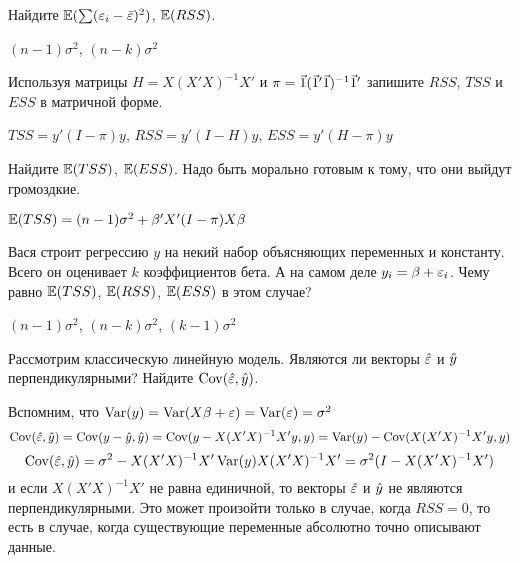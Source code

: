 \begin{problem}
Найдите $\mathbb{E}(\sum (\varepsilon_i-\bar{\varepsilon})^2 )$, $\mathbb{E}(RSS)$.


\begin{sol}
$(n-1)\sigma^2$, $(n-k)\sigma^2$
\end{sol}
\end{problem}



\begin{problem}
Используя матрицы $H=X(X'X)^{-1}X'$ и $\pi=\v1(\v1'\v1)^{-1}\v1'$ запишите $RSS$, $TSS$ и $ESS$ в матричной форме.

\begin{sol}
$TSS=y'(I-\pi)y$, $RSS=y'(I-H)y$, $ESS=y'(H-\pi)y$
\end{sol}
\end{problem}




\begin{problem}
Найдите $\mathbb{E}(TSS)$, $\mathbb{E}(ESS)$. Надо быть морально готовым к тому, что они выйдут громоздкие.

\begin{sol}
$\mathbb{E}(TSS)=(n-1)\sigma^2+\beta'X'(I-\pi)X\beta$
\end{sol}
\end{problem}



\begin{problem}
Вася строит регрессию $y$ на некий набор объясняющих переменных и константу.
Всего он оценивает $k$ коэффициентов бета.
А на самом деле $y_i=\beta + \varepsilon_i$. Чему равно $\mathbb{E}(TSS)$, $\mathbb{E}(RSS)$, $\mathbb{E}(ESS)$ в этом случае?


\begin{sol}
$(n-1)\sigma^2$, $(n-k)\sigma^2$, $(k-1)\sigma^2$
\end{sol}
\end{problem}




\begin{problem}
Рассмотрим классическую линейную модель. Являются ли векторы $\hat{\varepsilon}$ и $\hat{y}$ перпендикулярными? Найдите $\operatorname{Cov}(\hat{\varepsilon},\hat{y})$.


\begin{sol}
Вспомним, что $\operatorname{Var}(y)=\operatorname{Var}(X\beta+\varepsilon)=\operatorname{Var}(\varepsilon)=\sigma^2$
\[
\operatorname{Cov}(\hat{\varepsilon},\hat{y})=\operatorname{Cov}(y-\hat{y},\hat{y})=\operatorname{Cov}(y-X(X'X)^{-1}X'y,y)=\operatorname{Var}(y)-\operatorname{Cov}(X(X'X)^{-1}X'y,y)
\]
\[
\operatorname{Cov}(\hat{\varepsilon},\hat{y})=\sigma^2-X(X'X)^{-1}X'\operatorname{Var}(y)X(X'X)^{-1}X'=\sigma^2(I-X(X'X)^{-1}X')
\]
и если $X(X'X)^{-1}X'$ не равна единичной, то векторы $\hat{\varepsilon}$ и $\hat{y}$ не являются перпендикулярными. Это может произойти только в случае, когда $RSS=0$, то есть в случае, когда существующие переменные абсолютно точно описывают данные.
\end{sol}
\end{problem}


